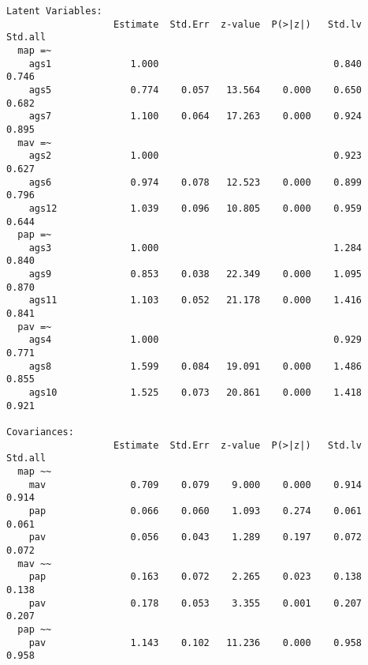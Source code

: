 \documentclass[
  letterpaper,
  DIV=11,
  numbers=noendperiod]{scrreprt}
\begin{document}
\begin{verbatim}
Latent Variables:
                   Estimate  Std.Err  z-value  P(>|z|)   Std.lv  Std.all
  map =~                                                                
    ags1              1.000                               0.840    0.746
    ags5              0.774    0.057   13.564    0.000    0.650    0.682
    ags7              1.100    0.064   17.263    0.000    0.924    0.895
  mav =~                                                                
    ags2              1.000                               0.923    0.627
    ags6              0.974    0.078   12.523    0.000    0.899    0.796
    ags12             1.039    0.096   10.805    0.000    0.959    0.644
  pap =~                                                                
    ags3              1.000                               1.284    0.840
    ags9              0.853    0.038   22.349    0.000    1.095    0.870
    ags11             1.103    0.052   21.178    0.000    1.416    0.841
  pav =~                                                                
    ags4              1.000                               0.929    0.771
    ags8              1.599    0.084   19.091    0.000    1.486    0.855
    ags10             1.525    0.073   20.861    0.000    1.418    0.921

Covariances:
                   Estimate  Std.Err  z-value  P(>|z|)   Std.lv  Std.all
  map ~~                                                                
    mav               0.709    0.079    9.000    0.000    0.914    0.914
    pap               0.066    0.060    1.093    0.274    0.061    0.061
    pav               0.056    0.043    1.289    0.197    0.072    0.072
  mav ~~                                                                
    pap               0.163    0.072    2.265    0.023    0.138    0.138
    pav               0.178    0.053    3.355    0.001    0.207    0.207
  pap ~~                                                                
    pav               1.143    0.102   11.236    0.000    0.958    0.958


\end{verbatim}
\end{document}
